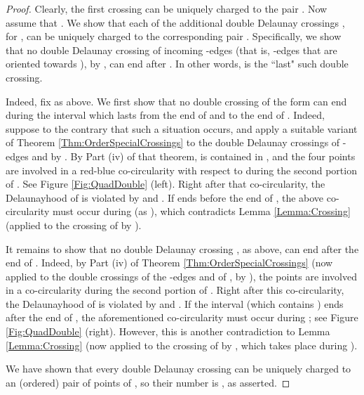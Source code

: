 \documentclass[letter,11pt]{article}
\begin{document}
\begin{proof}
Clearly, the first crossing  can be uniquely charged to the pair .
Now assume that . We show that each of the additional double Delaunay crossings , for , 
can be uniquely charged to the corresponding pair .
Specifically, we show that no double Delaunay crossing of incoming -edges  (that is, -edges that are oriented towards ), by , can end after . In other words,  is the ``last" such double crossing.

Indeed, fix  as above. We first show that no double crossing of the form  can end during the interval which lasts from the end of  and to the end of . Indeed, suppose to the contrary that such a situation occurs, and apply a suitable variant of Theorem \ref{Thm:OrderSpecialCrossings} to the double Delaunay crossings of -edges  and  by . 
By Part (iv) of that theorem,  is contained in , and the four points  are involved in a red-blue co-circularity with respect to  during the second portion of . See Figure \ref{Fig:QuadDouble} (left). Right after that co-circularity, the Delaunayhood of  is violated by  and . If  ends before the end of , the above co-circularity must occur during  (as ), which contradicts Lemma \ref{Lemma:Crossing} (applied to the crossing of  by ).

It remains to show that no double Delaunay crossing , as above, can end after the end of . Indeed, by Part (iv) of Theorem \ref{Thm:OrderSpecialCrossings} (now applied to the double crossings of the -edges  and of , by ), the points  are involved in a co-circularity during the second portion of . Right after this co-circularity, the Delaunayhood of  is violated by  and . 
If the interval  (which contains ) ends after the end of , the aforementioned co-circularity must occur during ; see Figure \ref{Fig:QuadDouble} (right). However, this is another contradiction to Lemma \ref{Lemma:Crossing} (now applied to the crossing of  by , which takes place during ).

We have shown that every double Delaunay crossing can be uniquely charged to an (ordered) pair of points of , so their number is , as asserted.
\end{proof}
\end{document}
